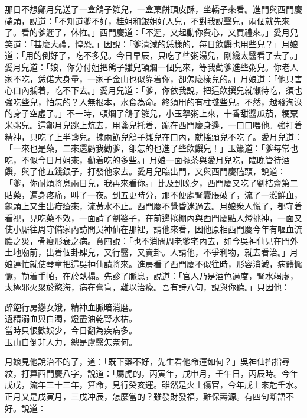 那日不想鄭月兒送了一盒鴿子雛兒，一盒菓餅頂皮酥，坐轎子來看。進門與西門慶磕頭，說道：「不知道爹不好，桂姐和銀姐好人兒，不對我說聲兒，兩個就先來了。看的爹遲了，休恠。」西門慶道：「不遲，又起動你費心，又買禮來。」愛月兒笑道：「甚麼大禮，惶恐。」因說：「爹清減的恁樣的，每日飲饌也用些兒？」月娘道：「用的倒好了，吃不多兒。今日早辰，只吃了些粥湯兒，剛纔太醫看了去了。」愛月兒道：「娘，你分付姐把鴿子雛兒頓爛一個兒來，等我勸爹進些粥兒。你老人家不吃，恁偌大身量，一家子金山也似靠着你，卻怎麼樣兒的。」月娘道：「他只害心口內攔着，吃不下去。」愛月兒道：「爹，你依我說，把這飲撰兒就懶待吃，須也強吃些兒，怕怎的？人無根本，水食為命。終須用的有柱攕些兒。不然，越發淘淥的身子空虛了。」不一時，頓爛了鴿子雛兒，小玉拏粥上來，十香甜醬瓜茄，粳粟米粥兒。這鄭月兒跳上炕去，用盞兒托着，跪在西門慶身邊，一口口喂他。強打着精神，只吃了上半盞兒。揀兩筯兒鴿子雛兒在口內，就搖頭兒不吃了。愛月兒道：「一來也是藥，{}二來還虧我勸爹，卻怎的也進了些飲饌兒！」玉簫道：「爹每常也吃，不似今日月姐來，勸着吃的多些。」月娘一面擺茶與愛月兒吃，臨晚管待酒饌，與了他五錢銀子，打發他家去。愛月兒臨出門，又與西門慶磕頭，說道：「爹，你耐煩將息兩日兒，我再來看你。」比及到晚夕，西門慶又吃了劉桔齋第二貼藥，遍身疼痛，叫了一夜。到五更時分，那不便處腎囊脹破了，流了一灘鮮血，龜頭上又生出疳瘡來，流黃水不止。{}西門慶不覺昏迷過去。月娘衆人慌了，都守着看視，見吃藥不效，一面請了劉婆子，在前邊捲棚內與西門慶點人燈挑神，一面又使小厮往周守備家內訪問吳神仙在那裡，請他來看，因他原相西門慶今年有嘔血流膿之災，骨瘦形衰之病。賁四說：「也不消問周老爹宅內去，如今吳神仙見在門外土地廟前，出着個卦肆兒，又行醫，又賣卦。人請他，不爭利物，就去看治。」月娘連忙就使琴童把這吳神仙請將來。進房看了西門慶不似往時，形容消減，病體懨懨，勒着手帕，在於臥榻。先診了脈息，說道：「官人乃是酒色過度，腎水竭虛，太極邪火聚於慾海，病在膏肓，難以治療。吾有詩八句，說與你聽。」只因他：

\begin{myquote} 
醉飽行房戀女娥，精神血脈暗消磨。\\遺精溺血與白濁，燈盡油乾腎水枯。\\當時只恨歡娛少，今日翻為疾病多。\\玉山自倒非人力，總是盧醫怎奈何。
\end{myquote} 

月娘見他說治不的了，道：「既下藥不好，先生看他命運如何？」吳神仙掐指尋紋，打算西門慶八字，說道：「屬虎的，丙寅年，戊申月，壬午日，丙辰時。今年戊戌，流年三十三年，算命，見行癸亥運。雖然是火土傷官，今年戊土來尅壬水。正月又是戊寅月，三戊冲辰，怎麼當的？雖發財發福，難保壽源。有四句斷語不好。說道：

